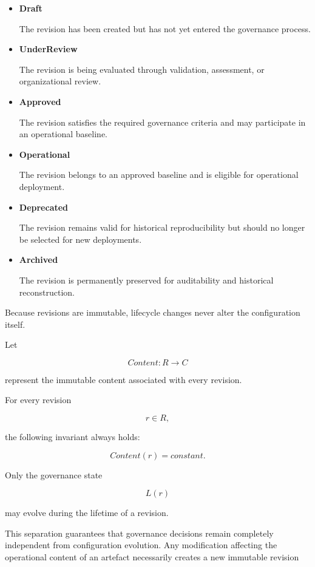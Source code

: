 \documentclass[10pt]{article}
\begin{document}
\begin{itemize}

\item \textbf{Draft}

The revision has been created but has not yet entered the governance process.

\item \textbf{UnderReview}

The revision is being evaluated through validation, assessment, or organizational review.

\item \textbf{Approved}

The revision satisfies the required governance criteria and may participate in an operational baseline.

\item \textbf{Operational}

The revision belongs to an approved baseline and is eligible for operational deployment.

\item \textbf{Deprecated}

The revision remains valid for historical reproducibility but should no longer be selected for new deployments.

\item \textbf{Archived}

The revision is permanently preserved for auditability and historical reconstruction.

\end{itemize}

Because revisions are immutable, lifecycle changes never alter the configuration itself.

Let

\[
Content:R\rightarrow C
\]

represent the immutable content associated with every revision.

For every revision

\[
r\in R,
\]

the following invariant always holds:

\[
Content(r)=constant.
\]

Only the governance state

\[
L(r)
\]

may evolve during the lifetime of a revision.

This separation guarantees that governance decisions remain completely independent from configuration evolution. Any modification affecting the operational content of an artefact necessarily creates a new immutable revision
\end{document}
